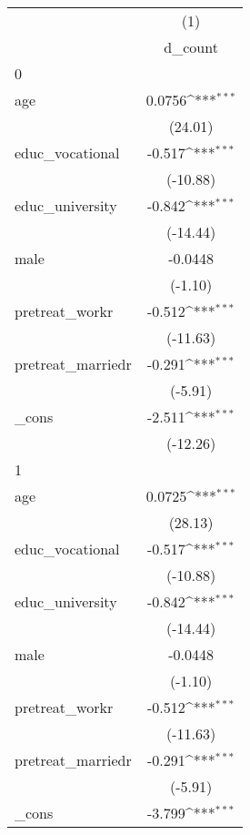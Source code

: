 {
\def\sym#1{\ifmmode^{#1}\else\(^{#1}\)\fi}
\begin{tabular}{l*{1}{c}}
\hline\hline
            &\multicolumn{1}{c}{(1)}\\
            &\multicolumn{1}{c}{d\_count}\\
\hline
0           &                     \\
age         &      0.0756\sym{***}\\
            &     (24.01)         \\
[1em]
educ\_vocational&      -0.517\sym{***}\\
            &    (-10.88)         \\
[1em]
educ\_university&      -0.842\sym{***}\\
            &    (-14.44)         \\
[1em]
male        &     -0.0448         \\
            &     (-1.10)         \\
[1em]
pretreat\_workr&      -0.512\sym{***}\\
            &    (-11.63)         \\
[1em]
pretreat\_marriedr&      -0.291\sym{***}\\
            &     (-5.91)         \\
[1em]
\_cons      &      -2.511\sym{***}\\
            &    (-12.26)         \\
\hline
1           &                     \\
age         &      0.0725\sym{***}\\
            &     (28.13)         \\
[1em]
educ\_vocational&      -0.517\sym{***}\\
            &    (-10.88)         \\
[1em]
educ\_university&      -0.842\sym{***}\\
            &    (-14.44)         \\
[1em]
male        &     -0.0448         \\
            &     (-1.10)         \\
[1em]
pretreat\_workr&      -0.512\sym{***}\\
            &    (-11.63)         \\
[1em]
pretreat\_marriedr&      -0.291\sym{***}\\
            &     (-5.91)         \\
[1em]
\_cons      &      -3.799\sym{***}\\

\end{tabular}}
